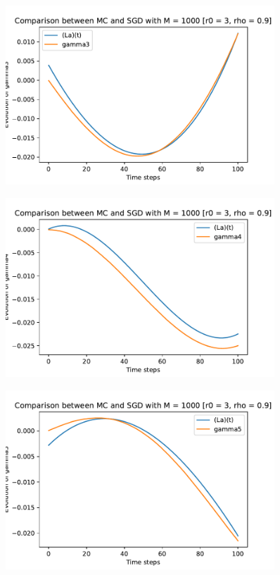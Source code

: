 \documentclass[a4paper,11pt,openright]{report}
\begin{document}
\begin{figure}[H]
\centering
\includegraphics[width=0.9\textwidth]{gamma3 SGD 1000.pdf}
\end{figure}
\begin{figure}[H]
\centering
\includegraphics[width=0.9\textwidth]{gamma4 SGD 1000.pdf}
\end{figure}
\begin{figure}[H]
\centering
\includegraphics[width=0.9\textwidth]{gamma5 SGD 1000.pdf}
\end{figure}
\end{document}
